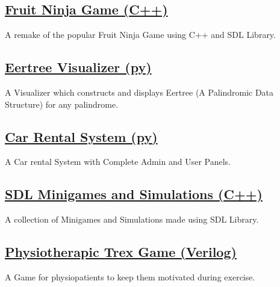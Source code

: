 \documentclass[]{m abbas resume' 2022}
\begin{document}
\begin{minipage}[t]{0.51\textwidth}
    \subsection{\href{https://github.com/smabbasht/Fruit-Ninja-Desktop-Game}{\textbf{Fruit Ninja Game (C++)}}}%
    A remake of the popular Fruit Ninja Game using C++ and SDL Library.

    \subsection{\href{https://github.com/smabbasht/Eertree-Visualizer}{\textbf{Eertree Visualizer (py)}}}%
    A Visualizer which constructs and displays Eertree (A Palindromic Data Structure) for any palindrome.

    \subsection{\href{https://github.com/smabbasht/Car-Rental-System}{\textbf{Car Rental System (py)}}}%
    A Car rental System with Complete Admin and User Panels.

    \subsection{\href{https://github.com/smabbasht/SDL-Minigames-and-Simulations}{\textbf{SDL Minigames and Simulations (C++)}}}%
    A collection of Minigames and Simulations made using SDL Library.

    \subsection{\href{https://github.com/smabbasht/Physiotherapic-Trex-Game}{\textbf{Physiotherapic Trex Game (Verilog)}}}%
    A Game for physiopatients to keep them motivated during exercise.
    

    

\end{minipage}
\end{document}

